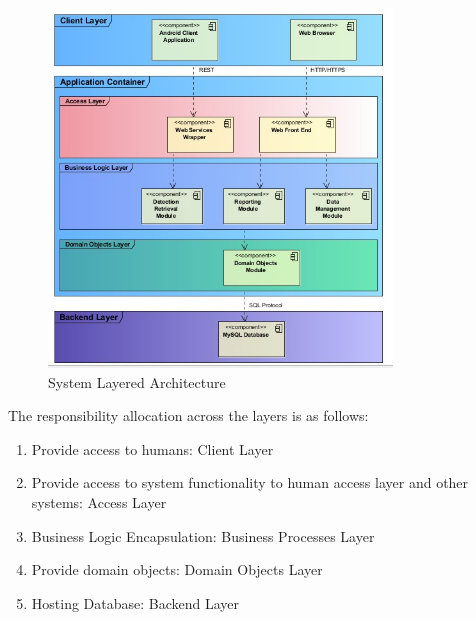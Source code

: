 \documentclass[12pt]{article}
\begin{document}
                			
                			\begin{figure}[h]
                                   \centering
                                   \includegraphics[width=3.59in, height=3.75in]{Pictures/SystemArchitectureLayers.jpg}
                                   \caption{System Layered Architecture}
        					\end{figure}
        					\FloatBarrier
                			
                			
                			The responsibility allocation across the layers is as follows:
                			\begin{enumerate}
                					\item Provide access to humans: Client Layer
                					\item Provide access to system functionality to human access layer and other systems: Access Layer
                					\item Business Logic Encapsulation: Business Processes Layer
                					\item Provide domain objects: Domain Objects Layer
                					\item Hosting Database: Backend Layer
                			\end{enumerate}
                			
\end{document}
